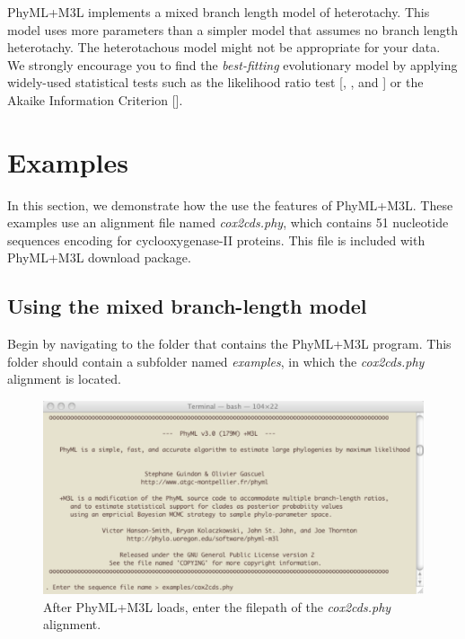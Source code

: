 \documentclass[11pt]{article}
\begin{document}
PhyML+M3L implements a mixed branch length model of heterotachy.  This model uses more parameters than a simpler model that assumes no branch length heterotachy.  The heterotachous model might not be appropriate for your data.  We strongly encourage you to find the \textit{best-fitting} evolutionary model by applying widely-used statistical tests such as the likelihood ratio test [\cite{felsenstein1981}, \cite{huelsenbeck1997}, and \cite{Huelsenbeck:1997hp}] or the Akaike Information Criterion [\cite{akaike1973}].

\pagebreak
\section{Examples}

In this section, we demonstrate how the use the features of PhyML+M3L.  These examples use an alignment file named \textit{cox2cds.phy}, which contains 51 nucleotide sequences encoding for cyclooxygenase-II proteins.  This file is included with PhyML+M3L download package.

\subsection{Using the mixed branch-length model}

Begin by navigating to the folder that contains the PhyML+M3L program.  This folder should contain a subfolder named \textit{examples}, in which the \textit{cox2cds.phy} alignment is located.

\begin{figure}[h]
\centering
\includegraphics[width=5.5 in]{GRAPHICS/a1.pdf}
\caption{After PhyML+M3L loads, enter the filepath of the \textit{cox2cds.phy} alignment.}
\end{figure}
\clearpage
\end{document}
